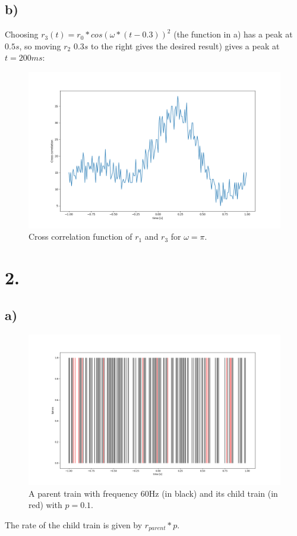 \subsection*{b)}
Choosing $r_3(t) = r_0 * cos(\omega * (t - 0.3))^2$ (the function in a) has a peak at $0.5s$, so moving $r_2$ $0.3s$ to the right gives the desired result) gives a peak at $t = 200ms$:
\begin{figure}[H]
\centering
\includegraphics[scale=0.4]{1_b_pi.png}
\caption{Cross correlation function of $r_1$ and $r_3$ for $\omega = \pi$.}
\end{figure}

\newpage

\section*{2.}
\subsection*{a)}
\begin{figure}[H]
\centering
\includegraphics[scale=0.4]{2_c_p=0_1.png}
\caption{A parent train with frequency 60Hz (in black) and its child train (in red) with $p=0.1$.}
\end{figure}
The rate of the child train is given by $r_{parent} * p$.

